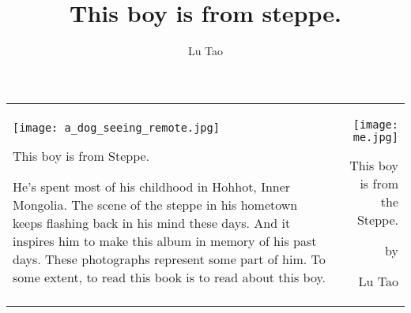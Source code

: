 \documentclass[12pt]{article}
\title{This boy is from steppe.}
\author{Lu Tao}
\begin{document}
\pagestyle{empty}
\begin{tabular*}{\textwidth}[t]{l@{\extracolsep{\fill}}r}
\begin{minipage}[t]{8in}
\centering
\texttt{[image: a\_dog\_seeing\_remote.jpg]}

\begin{center}
{\LARGE This boy is from Steppe.}
\end{center}

\large{He's spent most of his childhood in Hohhot, Inner Mongolia. 
The scene of the steppe in his hometown keeps flashing back in his mind these days.  
And it inspires him to make this album in memory of his past days.
These photographs represent some part of him.
To some extent, to read this book is to read about this boy.}

\end{minipage}
&

\begin{minipage}[t]{8in}
\centering

\texttt{[image: me.jpg]}

\vspace*{0.1in}
{\huge This boy is from the Steppe.}

\vspace*{0.1in}
by

\vspace*{0.1in}
{\LARGE Lu Tao}
\end{minipage}

\\
\end{tabular*}
\end{document}
